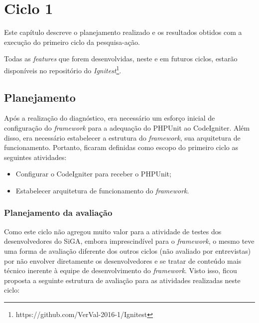 \chapter{Ciclo 1}
  
  Este capítulo descreve o planejamento realizado e os resultados obtidos com a execução do primeiro ciclo da pesquisa-ação.
  
  Todas as \textit{features} que forem desenvolvidas, neste e em futuros ciclos, estarão disponíveis no repositório do \textit{Ignitest}\footnote{https://github.com/VerVal-2016-1/Ignitest}.
  
  \section{Planejamento}
  
      Após a realização do diagnóstico, era necessário um esforço inicial de configuração do \textit{framework} para a 
      adequação do PHPUnit ao CodeIgniter. Além disso, era necessário estabelecer a estrutura do \textit{framework},
      sua arquitetura de funcionamento. Portanto, ficaram definidas como escopo do primeiro ciclo as seguintes atividades:
      
      \begin{itemize}
    
    \item Configurar o CodeIgniter para receber o PHPUnit;
    
    \item Estabelecer arquitetura de funcionamento do \textit{framework}.
    
      \end{itemize}
      
      
      \subsection{Planejamento da avaliação}
      
      Como este ciclo não agregou muito valor para a atividade de testes dos desenvolvedores do SiGA,
      embora imprescindível para o \textit{framework}, o mesmo teve uma forma de avaliação diferente
      dos outros ciclos (não avaliado por entrevistas) por não envolver diretamente os desenvolvedores e se
      tratar de conteúdo mais técnico inerente à equipe de desenvolvimento do \textit{framework}. Visto isso, ficou proposta
      a seguinte estrutura de avaliação para as atividades realizadas neste ciclo:
      
